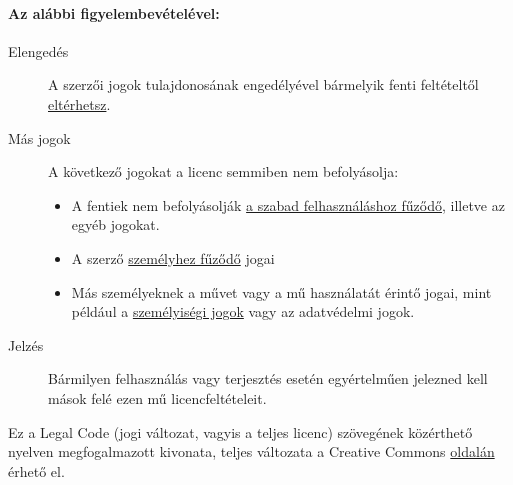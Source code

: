 \documentclass[a4paper, titlepage]{report}
\begin{document}
\paragraph{Az alábbi figyelembevételével:}

\begin{description}
 \item[Elengedés] A szerzői jogok tulajdonosának engedélyével bármelyik fenti feltételtől \href{http://creativecommons.org/licenses/by-sa/2.5/hu/#}{eltérhetsz}.
 \item[Más jogok] A következő jogokat a licenc semmiben nem befolyásolja:
 \begin{itemize}
  \item A fentiek nem befolyásolják \href{http://wiki.creativecommons.org/Frequently_Asked_Questions#Do_Creative_Commons_licenses_affect_fair_use.2C_fair_dealing_or_other_exceptions_to_copyright.3F}{a szabad felhasználáshoz fűződő}, illetve az egyéb jogokat.
  \item A szerző \href{http://wiki.creativecommons.org/Frequently_Asked_Questions#I_don.E2.80.99t_like_the_way_a_person_has_used_my_work_in_a_derivative_work_or_included_it_in_a_collective_work.3B_what_can_I_do.3F}{személyhez fűződő} jogai
  \item Más személyeknek a művet vagy a mű használatát érintő jogai, mint például a \href{http://wiki.creativecommons.org/Frequently_Asked_Questions#When_are_publicity_rights_relevant.3F}{személyiségi jogok} vagy az adatvédelmi jogok.
 \end{itemize}
 \item[Jelzés] Bármilyen felhasználás vagy terjesztés esetén egyértelműen jelezned kell mások felé ezen mű licencfeltételeit. 
\end{description}

Ez a Legal Code (jogi változat, vagyis a teljes licenc) szövegének közérthető nyelven megfogalmazott kivonata, teljes változata a Creative Commons \href{http://creativecommons.org/licenses/by-sa/2.5/hu/legalcode}{oldalán} érhető el.

\printindex

\listoftables

\listoffigures

\lstlistoflistings



\end{document}
